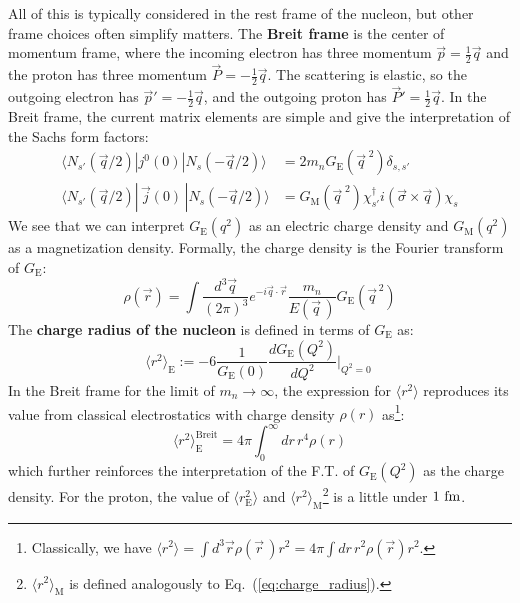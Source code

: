 \documentclass[11pt, oneside]{article}   	%
\theoremstyle{definition}
\begin{document}
All of this is typically considered in the rest frame of the nucleon, but other frame choices often simplify matters. The \textbf{Breit frame} is 
the center of momentum frame, where the incoming electron has three momentum $\vec p = \frac{1}{2}\vec q$ and the proton has three 
momentum $\vec P = -\frac{1}{2}\vec q$. The scattering is elastic, so the outgoing electron has $\vec p' = -\frac{1}{2}\vec q$, and the outgoing 
proton has $\vec P' = \frac{1}{2}\vec q$. In the Breit frame, the current matrix elements are simple and give the interpretation of the 
Sachs form factors:
\begin{align}
	\langle N_{s'}(\vec q / 2) | j^0(0) | N_s(-\vec q / 2)\rangle &= 2 m_n G_\mathrm{E}(\vec q^{\;2})\delta_{s, s'} \\
	\langle N_{s'}(\vec q / 2) |\, \vec j (0)\,| N_s(-\vec q / 2)\rangle &= G_\mathrm{M}(\vec q^{\;2})\chi_{s'}^\dagger i(\vec\sigma\times\vec q) 
	\chi_s 
\end{align}
We see that we can interpret $G_\mathrm{E}(q^2)$ as an electric charge density and $G_\mathrm{M}(q^2)$ as a magnetization density.
Formally, the charge density is the Fourier transform of $G_\mathrm{E}$:
\begin{equation}
	\rho(\vec r) = \int\frac{d^3\vec q}{(2\pi)^3} e^{-i\vec q\cdot\vec r} \frac{m_n}{E(\vec q\,)} G_\mathrm{E}(\vec q^{\,2})
\end{equation}
The  \textbf{charge radius of the nucleon} is defined in terms of $G_\mathrm{E}$ as:
\begin{equation}
	\langle r^2\rangle_\mathrm{E} := -6 \frac{1}{G_\mathrm{E}(0)}\frac{d G_\mathrm{E}(Q^2)}{dQ^2}\bigg|_{Q^2 = 0}~
	\label{eq:charge_radius}
\end{equation}
In the Breit frame for the limit of $m_n\rightarrow\infty$, the expression for $\langle r^2\rangle$ reproduces its 
value from classical electrostatics with charge density $\rho(r)$ as\footnote{Classically, we have $\langle r^2\rangle = \int d^3\vec r \rho(\vec 
r\,) r^2 = 4\pi \int dr \, r^2 \rho(\vec r) r^2$.}:
\begin{equation}
	\langle r^2\rangle_\mathrm{E}^\mathrm{Breit} = 4\pi\int_0^\infty dr\, r^4\rho(r)
\end{equation}
which further reinforces the interpretation of the F.T. of $G_\mathrm{E}(Q^2)$ as the charge density. For the proton, the value of 
$\langle r^2_\mathrm{E}\rangle$ and $\langle r^2\rangle_\mathrm{M}$\footnote{$\langle r^2\rangle_\mathrm{M}$ is defined analogously to 
Eq.~(\ref{eq:charge_radius}).} is a little under $1\textnormal{ fm}$.
\end{document}

